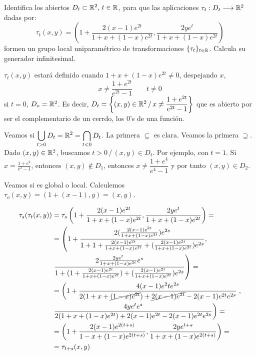 \begin{ejer}
    [2] Identifica los abiertos $D_t \subset \mathbb{R}^2, \, t \in \mathbb{R}$, para que las aplicaciones $\tau_t : D_t \longrightarrow \mathbb{R}^2$ dadas por:
    $$\tau_t(x,y) = \left(1+\dfrac{2(x-1)e^{2t}}{1+x+(1-x)e^{2t}},\dfrac{2ye^{t}}{1+x+(1-x)e^{2t}}\right)$$
formen un grupo local uniparam\'etrico de transformaciones $\{\tau_t\}_{t\in \mathbb{R}}$. Calcula su generador
infinitesimal.
\end{ejer}\begin{sol}
   $\tau_t(x,y)$ estar\'a definido cuando $1+x+(1-x)e^{2t} \neq 0$, despejando $x$,
    $$x\neq \dfrac{1+e^{2t}}{e^{2t}-1}\qquad t\neq 0$$
    si $t=0$, $D_o = \mathbb{R}^2$. Es decir, $D_t = \left\{ (x,y) \in \mathbb{R}^2 \, / \, x\neq \dfrac{1+e^{2t}}{e^{2t}-1}\right\}$ que es abierto por ser el complementario de un cerrdo, los 0's de una funci\'on.

    Veamos si $\displaystyle\bigcup_{t> 0} D_t= \mathbb{R}^2 = \bigcap_{t<0} D_t$. La primera $\subseteq$ es clara. Veamos la primera $\supseteq$. Dado $(x,y) \in \mathbb{R}^2$, buscamos $t>0 \, / \,  (x,y) \in D_t$. Por ejemplo, con $t=1$. Si $x=\frac{1+e^2}{e^2-1}$, entonces $(x,y)\nin D_1$, entonces $x\neq \dfrac{1+e^4}{e^4-1}$ y por tanto $(x,y) \in D_2$.

    Veamos si es global o local. Calculemos $\tau_o(x,y) = \left(1+(x-1),y \right) = (x,y)$. 

    \[\begin{split} \tau_s(\tau_t(x,y)) & = \tau_s\left(1+\dfrac{2(x-1)e^{2t}}{1+x+(1-x)e^{2t}},\dfrac{2ye^{t}}{1+x+(1-x)e^{2t}}\right)= \\ & = \left(1+\dfrac{2(\frac{2(x-1)e^{2t}}{1+x+(1-x)e^{2t}})e^{2s}}{1+1+\frac{2(x-1)e^{2t}}{1+x+(1-x)e^{2t}}+(\frac{2(x-1)e^{2t}}{1+x+(1-x)e^{2t}})e^{2s}},\right. \\ & \left.\dfrac{2\frac{2ye^{t}}{1+x+(1-x)e^{2t}}e^{s}}{1+(1+\frac{2(x-1)e^{2t}}{1+x+(1-x)e^{2t}})+(\frac{2(x-1)e^{2t}}{1+x+(1-x)e^{2t}})e^{2s}}\right) = \\ & =
    \left( 1+\dfrac{4(x-1)e^2t e^{2s}}{2(1+x+\cancel{(1-x)e^{2t}})+\cancel{2(x-1)e^{2t}} - 2(x-1)e^{2t}e^{2s}}\right., \\& 
    \left. \dfrac{4ye^te^s}{2(1+x+(1-x)e^{2t})+2(x-1)e^{2t} - 2(x-1)e^{2t}e^{2s}}\right) = \\ & = 
    \left( 1+\dfrac{2(x-1) e^{2(t+s)}}{1-x+(1-x) e^{2(t+s)}}, \dfrac{2ye^{t+s}}{1+x+(1-x)e^{2(t+s)}}\right) = \\ & = \tau_{t+s}(x,y)
    \end{split}\]


\end{sol}
